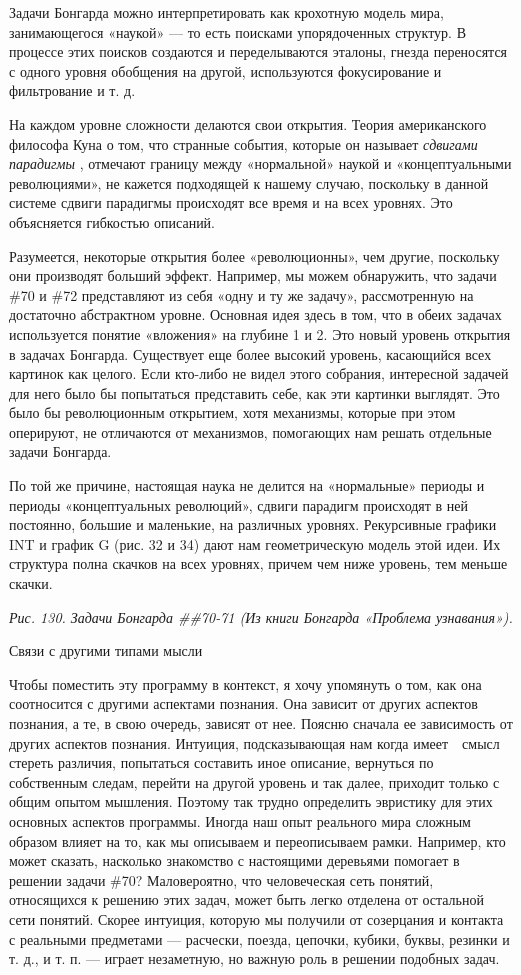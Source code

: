 \documentclass[../main.tex]{subfiles}
\begin{document}
Задачи Бонгарда можно интерпретировать как крохотную модель мира, занимающегося «наукой» --- то есть поисками упорядоченных структур. В процессе этих поисков создаются и переделываются эталоны, гнезда переносятся с одного уровня обобщения на другой, используются фокусирование и фильтрование и т. д.

На каждом уровне сложности делаются свои открытия. Теория американского философа Куна о том, что странные события, которые он называет \emph{сдвигами парадигмы} , отмечают границу между «нормальной» наукой и «концептуальными революциями», не кажется подходящей к нашему случаю, поскольку в данной системе сдвиги парадигмы происходят все время и на всех уровнях. Это объясняется гибкостью описаний.

Разумеется, некоторые открытия более «революционны», чем другие, поскольку они производят больший эффект. Например, мы можем обнаружить, что задачи \#70 и \#72 представляют из себя «одну и ту же задачу», рассмотренную на достаточно абстрактном уровне. Основная идея здесь в том, что в обеих задачах используется понятие «вложения» на глубине 1 и 2. Это новый уровень открытия в задачах Бонгарда. Существует еще более высокий уровень, касающийся всех картинок как целого. Если кто-либо не видел этого собрания, интересной задачей для него было бы попытаться представить себе, как эти картинки выглядят. Это было бы революционным открытием, хотя механизмы, которые при этом оперируют, не отличаются от механизмов, помогающих нам решать отдельные задачи Бонгарда.

По той же причине, настоящая наука не делится на «нормальные» периоды и периоды «концептуальных революций», сдвиги парадигм происходят в ней постоянно, большие и маленькие, на различных уровнях. Рекурсивные графики INT и график G (рис. 32 и 34) дают нам геометрическую модель этой идеи. Их структура полна скачков на всех уровнях, причем чем ниже уровень, тем меньше скачки.

\emph{Рис. 130. Задачи Бонгарда \#\#70-71 (Из книги Бонгарда «Проблема узнавания»).}

Связи с другими типами мысли

Чтобы поместить эту программу в контекст, я хочу упомянуть о том, как она соотносится с другими аспектами познания. Она зависит от других аспектов познания, а те, в свою очередь, зависят от нее. Поясню сначала ее зависимость от других аспектов познания. Интуиция, подсказывающая нам когда имеет~~смысл стереть различия, попытаться составить иное описание, вернуться по собственным следам, перейти на другой уровень и так далее, приходит только с общим опытом мышления. Поэтому так трудно определить эвристику для этих основных аспектов программы. Иногда наш опыт реального мира сложным образом влияет на то, как мы описываем и переописываем рамки. Например, кто может сказать, насколько знакомство с настоящими деревьями помогает в решении задачи \#70? Маловероятно, что человеческая сеть понятий, относящихся к решению этих задач, может быть легко отделена от остальной сети понятий. Скорее интуиция, которую мы получили от созерцания и контакта с реальными предметами --- расчески, поезда, цепочки, кубики, буквы, резинки и т. д., и т. п. --- играет незаметную, но важную роль в решении подобных задач.
\end{document}

